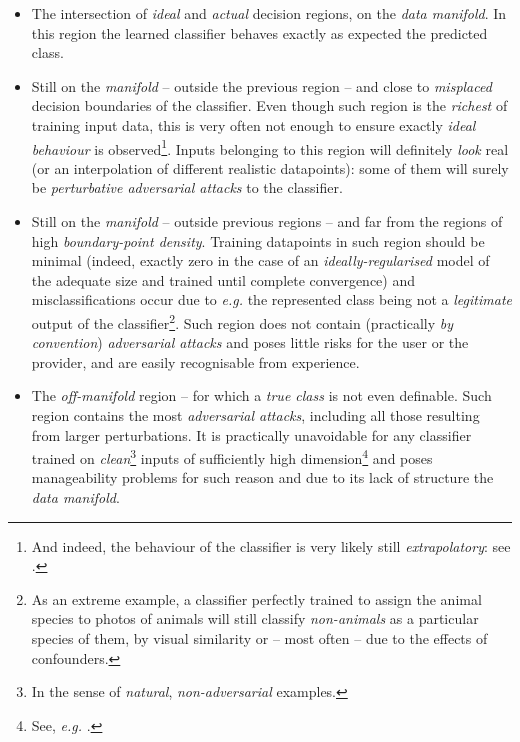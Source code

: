 \begin{itemize}
    \item The intersection of \textit{ideal} and \textit{actual} decision regions, on the \textit{data manifold}. In this region the learned classifier behaves exactly as expected \wrt the predicted class.
    \item Still on the \textit{manifold} -- outside the previous region -- and close to \textit{misplaced} decision boundaries of the classifier. Even though such region is the \textit{richest} of training input data, this is very often not enough to ensure exactly \textit{ideal behaviour} is observed\footnote{And indeed, the behaviour of the classifier is very likely still \textit{extrapolatory}: see \cite{BalestrieroEtAl2021Extrapolation}.}. Inputs belonging to this region will definitely \textit{look} real (or an interpolation of different realistic datapoints): some of them will surely be \textit{perturbative adversarial attacks} to the classifier.
    \item Still on the \textit{manifold} -- outside previous regions -- and far from the regions of high \textit{boundary-point density}. Training datapoints in such region should be minimal (indeed, exactly zero in the case of an \textit{ideally-regularised} model of the adequate size and trained until complete convergence) and misclassifications occur due to \textit{e.g.} the represented class being not a \textit{legitimate} output of the classifier\footnote{As an extreme example, a classifier perfectly trained to assign the animal species to photos of animals will still classify \textit{non-animals} as a particular species of them, by visual similarity or -- most often -- due to the effects of confounders.}. Such region does not contain (practically \textit{by convention}) \textit{adversarial attacks} and poses little risks for the user or the provider, and are easily recognisable from experience.
    \item The \textit{off-manifold} region -- for which a \textit{true class} is not even definable. Such region contains the most \textit{adversarial attacks}, including all those resulting from larger perturbations. It is practically unavoidable for any classifier trained on \textit{clean}\footnote{In the sense of \textit{natural}, \textit{non-adversarial} examples.} inputs of sufficiently high dimension\footnote{See, \textit{e.g.} \cite{BortolussiSanguinetti2018IntrinsicGV}.} and poses manageability problems for such reason and due to its lack of structure \wrt the \textit{data manifold}.
\end{itemize}

